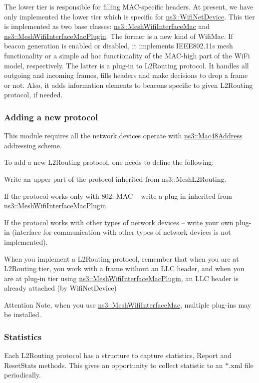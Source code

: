 The lower tier is responsible for filling M\+A\+C-\/specific headers. At present, we have only implemented the lower tier which is specific for \hyperlink{classns3_1_1WifiNetDevice}{ns3\+::\+Wifi\+Net\+Device}. This tier is implemented as two base classes\+: \hyperlink{classns3_1_1MeshWifiInterfaceMac}{ns3\+::\+Mesh\+Wifi\+Interface\+Mac} and \hyperlink{classns3_1_1MeshWifiInterfaceMacPlugin}{ns3\+::\+Mesh\+Wifi\+Interface\+Mac\+Plugin}. The former is a new kind of Wifi\+Mac. If beacon generation is enabled or disabled, it implements I\+E\+E\+E802.\+11s mesh functionality or a simple ad hoc functionality of the M\+A\+C-\/high part of the Wi\+Fi model, respectively. The latter is a plug-\/in to L2\+Routing protocol. It handles all outgoing and incoming frames, fills headers and make decisions to drop a frame or not. Also, it adds information elements to beacons specific to given L2\+Routing protocol, if needed.  \hypertarget{group__mesh_NewProtocol}{}\subsubsection{Adding a new protocol}\label{group__mesh_NewProtocol}
This module requires all the network devices operate with \hyperlink{classns3_1_1Mac48Address}{ns3\+::\+Mac48\+Address} addressing scheme.

To add a new L2\+Routing protocol, one needs to define the following\+:
\begin{DoxyItemize}
\item Write an upper part of the protocol inherited from ns3\+::\+Mesh\+L2\+Routing.
\item If the protocol works only with 802. M\+AC -- write a plug-\/in inherited from \hyperlink{classns3_1_1MeshWifiInterfaceMacPlugin}{ns3\+::\+Mesh\+Wifi\+Interface\+Mac\+Plugin}
\item If the protocol works with other types of network devices -- write your own plug-\/in (interface for communication with other types of network devices is not implemented).
\end{DoxyItemize}

When you implement a L2\+Routing protocol, remember that when you are at L2\+Routing tier, you work with a frame without an L\+LC header, and when you are at plug-\/in tier using \hyperlink{classns3_1_1MeshWifiInterfaceMacPlugin}{ns3\+::\+Mesh\+Wifi\+Interface\+Mac\+Plugin}, an L\+LC header is already attached (by Wifi\+Net\+Device)

\begin{DoxyAttention}{Attention}
Note, when you use \hyperlink{classns3_1_1MeshWifiInterfaceMac}{ns3\+::\+Mesh\+Wifi\+Interface\+Mac}, multiple plug-\/ins may be installed.
\end{DoxyAttention}
\hypertarget{group__mesh_Statistics}{}\subsubsection{Statistics}\label{group__mesh_Statistics}
Each L2\+Routing protocol has a structure to capture statistics, Report and Reset\+Stats methods. This gives an opportunity to collect statistic to an $\ast$.xml file periodically. 